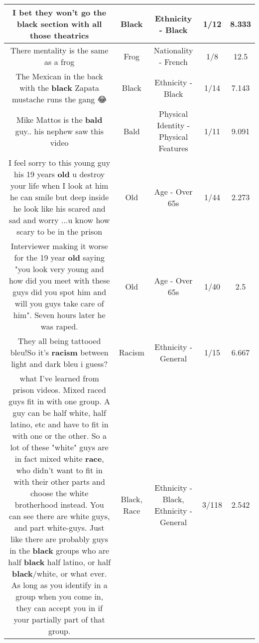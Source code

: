 \documentclass[11pt]{article}
\newlength\mylength
\begin{document}
\begin{center}
\begin{longtable}{|C{.65\mylength}|C{.30\mylength}|C{.12\mylength}|C{.12\mylength}|C{.12\mylength}|}
  \small I bet they won't go the \textbf{black} section with all those theatrics\normalsize   & Black & Ethnicity - Black & 1/12 & 8.333 \\  \hline
  \small There mentality is the same as a frog\normalsize   & Frog & Nationality - French & 1/8 & 12.5 \\  \hline
  \small The Mexican in the back with the \textbf{black} Zapata mustache runs the gang 😂\normalsize   & Black & Ethnicity - Black & 1/14 & 7.143 \\  \hline
  \small Mike Mattos is the \textbf{bald} guy.. his nephew saw this video\normalsize   & Bald & Physical Identity - Physical Features & 1/11 & 9.091 \\  \hline
  \small I feel sorry to this young guy his 19 years \textbf{old} u destroy your life when I look at him he can smile but deep inside he look like his scared and sad and worry ...u know how scary to be in the prison\normalsize   & Old & Age - Over 65s & 1/44 & 2.273 \\  \hline
  \small Interviewer making it worse for the 19 year \textbf{old} saying "you look very young and how did you meet with these guys did you spot him and will you guys take care of him". Seven hours later he was raped.\normalsize   & Old & Age - Over 65s & 1/40 & 2.5 \\  \hline
  \small They all being  tattooed bleu!So it's \textbf{racism} between light and dark bleu i guess?\normalsize   & Racism & Ethnicity - General & 1/15 & 6.667 \\  \hline
  \small what I've learned from prison videos. Mixed raced guys fit in with one group. A guy can be half white, half latino, etc and have to fit in with one or the other. So a lot of these "white" guys are in fact mixed white \textbf{race}, who didn't want to fit in with their other parts and choose the white brotherhood instead. You can see there are white guys, and part white-guys. Just like there are probably guys in the \textbf{black} groups who are half \textbf{black} half latino, or half \textbf{black}/white, or what ever. As long as you identify in a group when you come in, they can accept you in if your partially part of that group.\normalsize   & Black, Race & Ethnicity - Black, Ethnicity - General & 3/118 & 2.542 \\  \hline

\end{longtable}
\end{center}
\end{document}
